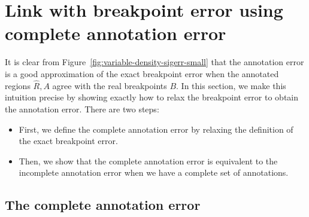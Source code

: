 \documentclass{jsfds} %
\begin{document}
\section{Link with breakpoint error using 
complete annotation error}
\label{sec:complete}
It is clear from Figure~\ref{fig:variable-density-sigerr-small} that
the annotation error is a good approximation of the exact breakpoint
error when the annotated regions $\hat R,A$ agree with the real
breakpoints $B$. In this section, we make this intuition precise by
showing exactly how to relax the breakpoint error to obtain the
annotation error. There are two steps:
\begin{itemize}
\item First, we define the complete annotation error by relaxing the
  definition of the exact breakpoint error.
\item Then, we show that the complete annotation error is equivalent
  to the incomplete annotation error when we have a complete set of
  annotations.
\end{itemize}


\subsection{The complete annotation error}
\end{document}
